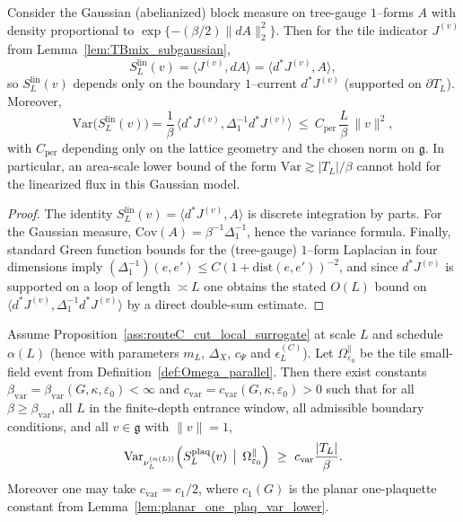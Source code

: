 \begin{lemma}\label{lem:TBmix_stokes_perimeter}
Consider the Gaussian (abelianized) block measure on tree-gauge $1$--forms $A$ with density proportional to
$\exp\{-(\beta/2)\|dA\|_2^2\}$.
Then for the tile indicator $J^{(v)}$ from Lemma~\ref{lem:TBmix_subgaussian},
\[
S_L^{\mathrm{lin}}(v)=\langle J^{(v)},dA\rangle = \langle d^*J^{(v)},A\rangle,
\]
so $S_L^{\mathrm{lin}}(v)$ depends only on the boundary $1$--current $d^*J^{(v)}$ (supported on $\partial T_L$).
Moreover,
\[
\mathrm{Var}\big(S_L^{\mathrm{lin}}(v)\big)
=\frac{1}{\beta}\,\langle d^*J^{(v)},\Delta_1^{-1}d^*J^{(v)}\rangle
\ \le\ C_{\mathrm{per}}\,\frac{L}{\beta}\,\|v\|^2,
\]
with $C_{\mathrm{per}}$ depending only on the lattice geometry and the chosen norm on $\mathfrak g$.
In particular, an area-scale lower bound of the form $\mathrm{Var}\gtrsim |T_L|/\beta$ cannot hold for the linearized flux in this Gaussian model.
\end{lemma}

\begin{proof}
The identity $S_L^{\mathrm{lin}}(v)=\langle d^*J^{(v)},A\rangle$ is discrete integration by parts.
For the Gaussian measure, $\mathrm{Cov}(A)=\beta^{-1}\Delta_1^{-1}$, hence the variance formula.
Finally, standard Green function bounds for the (tree-gauge) $1$--form Laplacian in four dimensions imply
$(\Delta_1^{-1})(e,e')\le C(1+\mathrm{dist}(e,e'))^{-2}$, and since $d^*J^{(v)}$ is supported on a loop of length $\asymp L$
one obtains the stated $O(L)$ bound on $\langle d^*J^{(v)},\Delta_1^{-1}d^*J^{(v)}\rangle$ by a direct double-sum estimate.
\end{proof}


\begin{proposition}\label{prop:TBmix_var_lower}
Assume Proposition~\ref{ass:routeC_cut_local_surrogate} at scale $L$ and schedule $\alpha(L)$ (hence with parameters
$m_L$, $\Delta_X$, $c_{\Psi}$ and $\epsilon_L^{(C)}$).
Let $\Omega_{\varepsilon_0}^{\parallel}$ be the tile small-field event from Definition~\ref{def:Omega_parallel}.
Then there exist constants $\beta_{\mathrm{var}}=\beta_{\mathrm{var}}(G,\kappa,\varepsilon_0)<\infty$ and
$c_{\mathrm{var}}=c_{\mathrm{var}}(G,\kappa,\varepsilon_0)>0$ such that for all $\beta\ge \beta_{\mathrm{var}}$,
all $L$ in the finite-depth entrance window, all admissible boundary conditions, and all $v\in\mathfrak g$ with $\|v\|=1$,
\begin{equation}\label{eq:TBmix_var_lower}
\mathrm{Var}_{\nu_L^{(\alpha(L))}}\!\left(S_L^{\mathrm{plaq}}(v)\,\bigm|\,\Omega_{\varepsilon_0}^{\parallel}\right)
\ \ge\
c_{\mathrm{var}}\frac{|T_L|}{\beta}.
\end{equation}
Moreover one may take $c_{\mathrm{var}}=c_1/2$, where $c_1(G)$ is the planar one-plaquette constant from Lemma~\ref{lem:planar_one_plaq_var_lower}.
\end{proposition}

